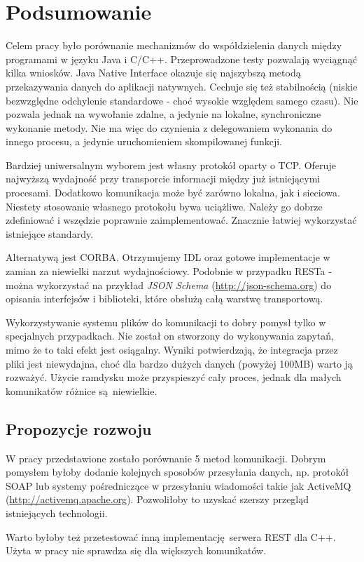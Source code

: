 \chapter{Podsumowanie}

Celem pracy było porównanie mechanizmów do współdzielenia danych między programami w języku Java i C/C++. Przeprowadzone testy pozwalają wyciągnąć kilka wniosków.
Java Native Interface okazuje się najszybszą metodą przekazywania danych do aplikacji natywnych. Cechuje się też stabilnością (niskie bezwzględne odchylenie standardowe - choć wysokie względem samego czasu). Nie pozwala jednak na wywołanie zdalne, a jedynie na lokalne, synchroniczne wykonanie metody. Nie ma więc do czynienia z delegowaniem wykonania do innego procesu, a jedynie uruchomieniem skompilowanej funkcji.

Bardziej uniwersalnym wyborem jest własny protokół oparty o TCP. Oferuje najwyższą wydajność przy transporcie informacji między już istniejącymi procesami. Dodatkowo komunikacja może być zarówno lokalna, jak i sieciowa. Niestety stosowanie własnego protokołu bywa uciążliwe. Należy go dobrze zdefiniować i wszędzie poprawnie zaimplementować. Znacznie łatwiej wykorzystać istniejące standardy.

Alternatywą jest CORBA. Otrzymujemy IDL oraz gotowe implementacje w zamian za niewielki narzut wydajnościowy. Podobnie w przypadku RESTa - można wykorzystać na przykład \textit{JSON Schema} (\url{http://json-schema.org}) do opisania interfejsów i biblioteki, które obsłużą całą warstwę transportową.

Wykorzystywanie systemu plików do komunikacji to dobry pomysł tylko w specjalnych przypadkach. Nie został on stworzony do wykonywania zapytań, mimo że to taki efekt jest osiągalny. Wyniki potwierdzają, że integracja przez pliki jest niewydajna, choć dla bardzo dużych danych (powyżej 100MB) warto ją rozważyć. Użycie ramdysku może przyspieszyć cały proces, jednak dla małych komunikatów różnice są niewielkie.


\section{Propozycje rozwoju}

W pracy przedstawione zostało porównanie 5 metod komunikacji. Dobrym pomysłem byłoby dodanie kolejnych sposobów przesyłania danych, np. protokół SOAP lub systemy pośredniczące w przesyłaniu wiadomości takie jak ActiveMQ (\url{http://activemq.apache.org}). Pozwoliłoby to uzyskać szerszy przegląd istniejących technologii.

Warto byłoby też przetestować inną implementację serwera REST dla C++. Użyta w pracy nie sprawdza się dla większych komunikatów.
